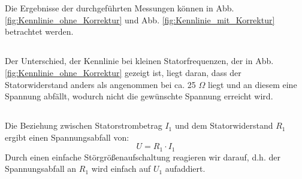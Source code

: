 \chapter{}\label{ex:aufg7}
%
\section{}\label{sec:aufg7a}
Die Ergebnisse der durchgeführten Messungen können in Abb. \ref{fig:Kennlinie_ohne_Korrektur} und Abb. \ref{fig:Kennlinie_mit_Korrektur} betrachtet werden.
\section{}\label{sec:aufg7b}
Der Unterschied, der Kennlinie bei kleinen Statorfrequenzen, der in Abb. \ref{fig:Kennlinie_ohne_Korrektur} gezeigt ist, liegt daran, dass der Statorwiderstand anders als angenommen bei ca. 25 $\Omega$ liegt und an diesem eine Spannung abfällt, wodurch nicht die gewünschte Spannung erreicht wird.
\section{}\label{sec:aufg7c}
Die Beziehung zwischen Statorstrombetrag $I_1$ und dem Statorwiderstand $R_1$ ergibt einen Spannungsabfall von:
\begin{equation}
	U = R_1 \cdot I_1
\end{equation}
Durch einen einfache Störgrößenaufschaltung reagieren wir darauf, d.h. der Spannungsabfall an $R_1$ wird einfach auf $U_1$ aufaddiert. 

